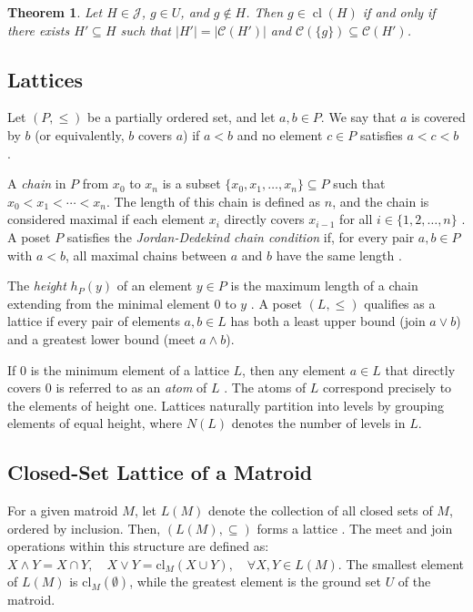 \documentclass{article}
\newtheorem{theorem}{Theorem}[section]
\begin{document}
\begin{theorem}\label{matching2}\citep{Mirsky1971}
    Let $H \in \mathcal{J}$, $g \in U$, and $g \not\in H$. Then $g \in \operatorname{cl}(H)$ if and only if there exists $H' \subseteq H$ such that $|H'| = |\mathcal{C}(H')|$ and $\mathcal{C}(\{g\}) \subseteq \mathcal{C}(H')$.
    \end{theorem}


\subsection{Lattices}
Let \( (P, \leq) \) be a partially ordered set, and let \( a, b \in P \). We say that \( a \) is covered by \( b \) (or equivalently, \( b \) covers \( a \)) if \( a < b \) and no element \( c \in P \) satisfies \( a < c < b \) \citep{Birkhoff1940}.

A \textit{chain} in \( P \) from \( x_0 \) to \( x_n \) is a subset \( \{x_0, x_1, \dots, x_n\} \subseteq P \) such that \( x_0 < x_1 < \cdots < x_n \). The length of this chain is defined as \( n \), and the chain is considered maximal if each element \( x_i \) directly covers \( x_{i-1} \) for all \( i \in \{1, 2, \dots, n\} \) \citep{Stanley2012}. A poset \( P \) satisfies the \textit{Jordan-Dedekind chain condition} if, for every pair \( a, b \in P \) with \( a < b \), all maximal chains between \( a \) and \( b \) have the same length \citep{Gratzer2011}.

The \textit{height} \( h_P(y) \) of an element \( y \in P \) is the maximum length of a chain extending from the minimal element \( 0 \) to \( y \) \citep{Stanley2015}. A poset \( (L, \leq) \) qualifies as a lattice if every pair of elements \( a, b \in L \) has both a least upper bound (join \( a \vee b \)) and a greatest lower bound (meet \( a \wedge b \)).

If $0$ is the minimum element of a lattice \( L \), then any element \( a \in L \) that directly covers \( 0 \) is referred to as an \textit{atom} of \( L \) \citep{Birkhoff1940}. The atoms of \( L \) correspond precisely to the elements of height one. 
Lattices naturally partition into levels by grouping elements of equal height, where \( N(L) \) denotes the number of levels in \( L \).

\subsection{Closed-Set Lattice of a Matroid}
For a given matroid \( M \), let \( L(M) \) denote the collection of all closed sets of \( M \), ordered by inclusion. Then, \( (L(M), \subseteq) \) forms a lattice \citep{Oxley2006}. The meet and join operations within this structure are defined as:
$
X \wedge Y = X \cap Y, \quad X \vee Y = \mathrm{cl}_M(X \cup Y), \quad \forall X, Y \in L(M).
$
The smallest element of \( L(M) \) is \( \mathrm{cl}_M(\emptyset) \), while the greatest element is the ground set \( U \) of the matroid.
\end{document}

